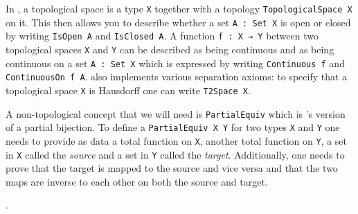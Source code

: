 In \mathlib, a topological space is a type \lstinline|X| together with a topology \lstinline|TopologicalSpace X| on it.
This then allows you to describe whether a set \lstinline|A : Set X| is open or closed by writing \lstinline|IsOpen A| and \lstinline|IsClosed A|. 
A function \lstinline|f : X → Y| between two topological spaces \lstinline|X| and \lstinline|Y| can be described as being continuous and as being continuous on a set \lstinline|A : Set X| which is expressed by writing \lstinline|Continuous f| and \lstinline|ContinuousOn f A|. 
\mathlib also implements various separation axioms: to specify that a topological space \lstinline|X| is Hausdorff one can write \lstinline|T2Space X|.

A non-topological concept that we will need is \lstinline|PartialEquiv| which is \mathlib's version of a partial bijection. 
To define a \lstinline|PartialEquiv X Y| for two types \lstinline|X| and \lstinline|Y| one needs to provide as data a total function on \lstinline|X|, another total function on \lstinline|Y|, a set in \lstinline|X| called the \emph{source} and a set in \lstinline|Y| called the \emph{target}. 
Additionally, one needs to prove that the target is mapped to the source and vice versa and that the two maps are inverse to each other on both the source and target. 

.